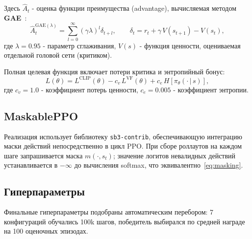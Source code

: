 \documentclass[12pt, a4paper]{article}
\newcommand{\given}{\,|\,}
\begin{document}
Здесь $\hat{A}_t$ - оценка функции преимущества (advantage), вычисляемая методом \textbf{GAE}~\cite{schulman2015}:
\begin{equation}
  \hat{A}_t^{\text{GAE}(\lambda)}
  = \sum_{l=0}^{\infty} (\gamma\lambda)^l \delta_{t+l},
  \qquad
  \delta_t = r_t + \gamma\, V(s_{t+1}) - V(s_t),
\end{equation}
где $\lambda = 0.95$ - параметр сглаживания, $V(s)$ - функция ценности, оцениваемая отдельной головой сети (критиком).

Полная целевая функция включает потери критика и энтропийный бонус:
\begin{equation}
  L(\theta) = L^{\text{CLIP}}(\theta)
            - c_v\, L^{\text{VF}}(\theta)
            + c_e\, H\!\left[\pi_\theta(\cdot \given s)\right],
\end{equation}
где $c_v = 1.0$ - коэффициент потерь ценности, $c_e = 0.005$ - коэффициент энтропии.

\subsection{MaskablePPO}

Реализация использует библиотеку \texttt{sb3-contrib}, обеспечивающую интеграцию маски действий непосредственно в цикл PPO. При сборе роллаутов на каждом шаге запрашивается маска $m(\cdot, s_t)$; значение логитов невалидных действий устанавливается в $-\infty$ до вычисления softmax, что эквивалентно~\eqref{eq:masking}.

\subsection{Гиперпараметры}

Финальные гиперпараметры подобраны автоматическим перебором: 7 конфигураций обучались 100k шагов, победитель выбирался по средней награде на 100 оценочных эпизодах.
\end{document}
